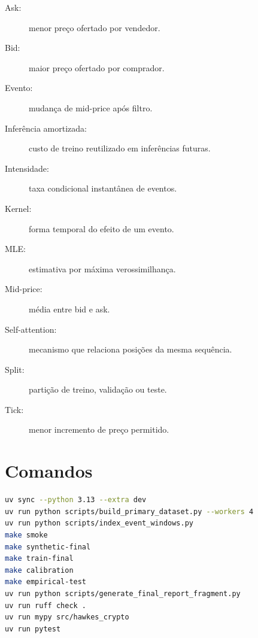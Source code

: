 \documentclass[12pt,a4paper,openany]{report}
\begin{document}
\begin{description}
  \item[Ask:] menor preço ofertado por vendedor.
  \item[Bid:] maior preço ofertado por comprador.
  \item[Evento:] mudança de mid-price após filtro.
  \item[Inferência amortizada:] custo de treino reutilizado em inferências futuras.
  \item[Intensidade:] taxa condicional instantânea de eventos.
  \item[Kernel:] forma temporal do efeito de um evento.
  \item[MLE:] estimativa por máxima verossimilhança.
  \item[Mid-price:] média entre bid e ask.
  \item[Self-attention:] mecanismo que relaciona posições da mesma sequência.
  \item[Split:] partição de treino, validação ou teste.
  \item[Tick:] menor incremento de preço permitido.
\end{description}

\chapter{Comandos}

\begin{lstlisting}[language=bash]
uv sync --python 3.13 --extra dev
uv run python scripts/build_primary_dataset.py --workers 4
uv run python scripts/index_event_windows.py
make smoke
make synthetic-final
make train-final
make calibration
make empirical-test
uv run python scripts/generate_final_report_fragment.py
uv run ruff check .
uv run mypy src/hawkes_crypto
uv run pytest
\end{lstlisting}



\end{document}
